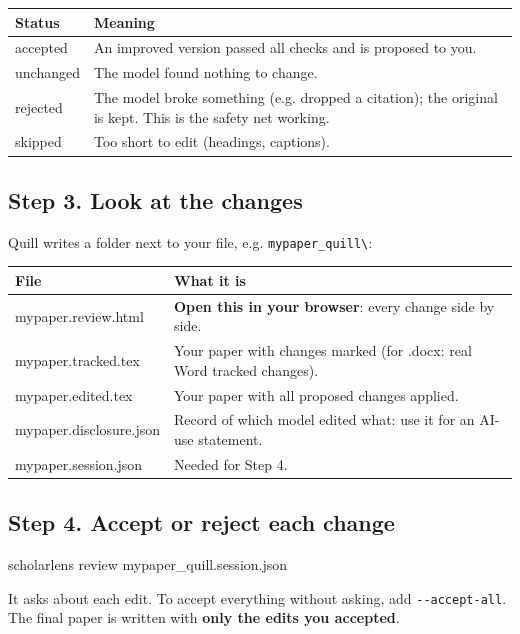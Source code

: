\documentclass[11pt]{article}
\newcommand{\cm}[1]{\texttt{#1}}
\begin{document}
\begin{tabularx}{\linewidth}{@{}>{\ttfamily}l X@{}}
\toprule
\normalfont Status & Meaning \\
\midrule
accepted & An improved version passed all checks and is proposed to you. \\
unchanged & The model found nothing to change. \\
rejected & The model broke something (e.g. dropped a citation); the original is kept. This is the safety net working. \\
skipped & Too short to edit (headings, captions). \\
\bottomrule
\end{tabularx}

\subsection*{Step 3. Look at the changes}
Quill writes a folder next to your file, e.g. \cm{mypaper\_quill\textbackslash}:

\begin{tabularx}{\linewidth}{@{}>{\ttfamily}l X@{}}
\toprule
\normalfont File & What it is \\
\midrule
mypaper.review.html & \textbf{Open this in your browser}: every change side by side. \\
mypaper.tracked.tex & Your paper with changes marked (for .docx: real Word tracked changes). \\
mypaper.edited.tex & Your paper with all proposed changes applied. \\
mypaper.disclosure.json & Record of which model edited what: use it for an AI-use statement. \\
mypaper.session.json & Needed for Step 4. \\
\bottomrule
\end{tabularx}

\subsection*{Step 4. Accept or reject each change}
\begin{cmd}
scholarlens review mypaper_quill\mypaper.session.json
\end{cmd}
It asks about each edit. To accept everything without asking, add \cm{-{}-accept-all}. The final paper is written with \textbf{only the edits you accepted}.
\end{document}
